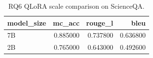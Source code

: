 \begin{table}
\caption{RQ6 QLoRA scale comparison on ScienceQA.}
\label{tab:rq6_scale}
\begin{tabular}{lrrr}
\toprule
model_size & mc_acc & rouge_l & bleu \\
\midrule
7B & 0.885000 & 0.737800 & 0.636800 \\
2B & 0.765000 & 0.643000 & 0.492600 \\
\bottomrule
\end{tabular}
\end{table}
